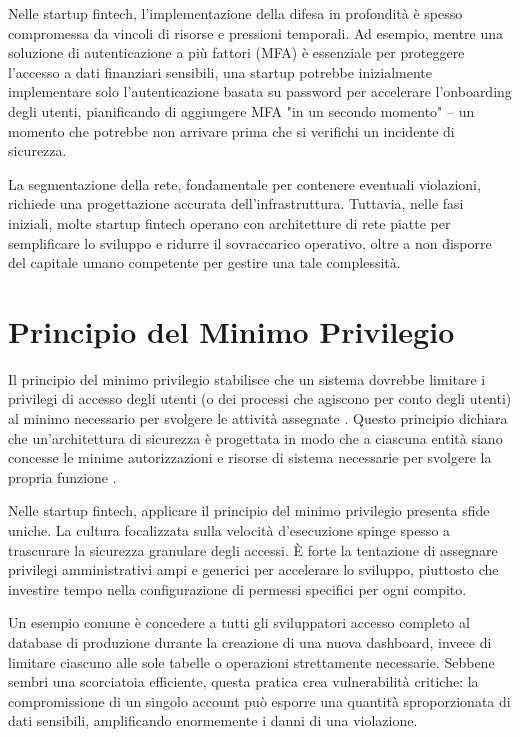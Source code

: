 Nelle startup fintech, l'implementazione della difesa in profondità è spesso compromessa da vincoli di risorse e pressioni temporali. Ad esempio, mentre una soluzione di autenticazione a più fattori (MFA) è essenziale per proteggere l'accesso a dati finanziari sensibili, una startup potrebbe inizialmente implementare solo l'autenticazione basata su password per accelerare l'onboarding degli utenti, pianificando di aggiungere MFA "in un secondo momento" – un momento che potrebbe non arrivare prima che si verifichi un incidente di sicurezza.

La segmentazione della rete, fondamentale per contenere eventuali violazioni, richiede una progettazione accurata dell'infrastruttura. Tuttavia, nelle fasi iniziali, molte startup fintech operano con architetture di rete piatte per semplificare lo sviluppo e ridurre il sovraccarico operativo, oltre a non disporre del capitale umano competente per gestire una tale complessità.

\section{Principio del Minimo Privilegio}
Il principio del minimo privilegio stabilisce che un sistema dovrebbe limitare i privilegi di accesso degli utenti (o dei processi che agiscono per conto degli utenti) al minimo necessario per svolgere le attività assegnate \cite{NIST_Glossary}. Questo principio dichiara che un'architettura di sicurezza è progettata in modo che a ciascuna entità siano concesse le minime autorizzazioni e risorse di sistema necessarie per svolgere la propria funzione \cite{NIST_Glossary}.

Nelle startup fintech, applicare il principio del minimo privilegio presenta sfide uniche. La cultura focalizzata sulla velocità d'esecuzione spinge spesso a trascurare la sicurezza granulare degli accessi. È forte la tentazione di assegnare privilegi amministrativi ampi e generici per accelerare lo sviluppo, piuttosto che investire tempo nella configurazione di permessi specifici per ogni compito.

Un esempio comune è concedere a tutti gli sviluppatori accesso completo al database di produzione durante la creazione di una nuova dashboard, invece di limitare ciascuno alle sole tabelle o operazioni strettamente necessarie. Sebbene sembri una scorciatoia efficiente, questa pratica crea vulnerabilità critiche: la compromissione di un singolo account può esporre una quantità sproporzionata di dati sensibili, amplificando enormemente i danni di una violazione.

